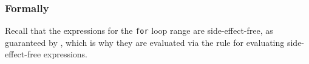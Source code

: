 \subsubsection{Formally}
Recall that the expressions for the \texttt{for} loop range are
side-effect-free, as guaranteed by , which is why
they are evaluated via the rule for evaluating side-effect-free expressions.
\begin{mathpar}
\end{mathpar}


